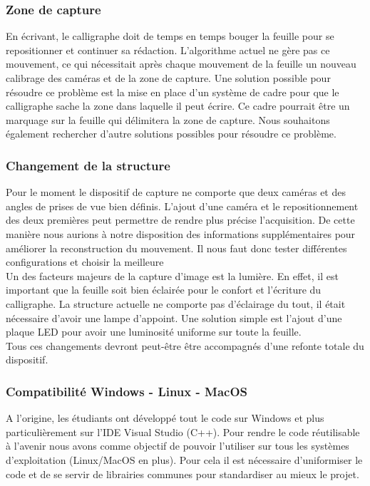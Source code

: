 \subsubsection{Zone de capture}

En écrivant, le calligraphe doit de temps en temps bouger la feuille pour se repositionner et continuer sa rédaction. L'algorithme actuel ne gère pas ce mouvement, ce qui nécessitait après chaque mouvement de la feuille un nouveau calibrage des caméras et de la zone de capture. Une solution possible pour résoudre ce problème est la mise en place d'un système de cadre pour que le calligraphe sache la zone dans laquelle il peut écrire. Ce cadre pourrait être un marquage sur la feuille qui délimitera la zone de capture. Nous souhaitons également rechercher d'autre solutions possibles pour résoudre ce problème.

\subsubsection{Changement de la structure}

Pour le moment le dispositif de capture ne comporte que deux caméras et des angles de prises de vue bien définis. L'ajout d'une caméra et le repositionnement des deux premières peut permettre de rendre plus précise l'acquisition. De cette manière nous aurions à notre disposition des informations supplémentaires pour améliorer la reconstruction du mouvement. Il nous faut donc tester différentes configurations et choisir la meilleure \\

Un des facteurs majeurs de la capture d'image est la lumière. En effet, il est important que la feuille soit bien éclairée pour le confort et l'écriture du calligraphe. La structure actuelle ne comporte pas d'éclairage du tout, il était nécessaire d'avoir une lampe d’appoint. Une solution simple est l'ajout d'une plaque LED pour avoir une luminosité uniforme sur toute la feuille. \\

Tous ces changements devront peut-être être accompagnés d'une refonte totale du dispositif.

\subsubsection{Compatibilité Windows - Linux - MacOS}

A l'origine, les étudiants ont développé tout le code sur Windows et plus particulièrement sur l'IDE Visual Studio (C++). Pour rendre le code réutilisable à l'avenir nous avons comme objectif de pouvoir l'utiliser sur tous les systèmes d'exploitation (Linux/MacOS en plus). Pour cela il est nécessaire d'uniformiser le code et de se servir de librairies communes pour standardiser au mieux le projet.